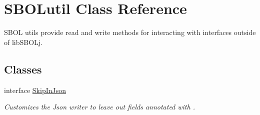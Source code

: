 \hypertarget{classorg_1_1sbolstandard_1_1lib_s_b_o_lj_1_1_s_b_o_lutil}{
\section{SBOLutil Class Reference}
\label{classorg_1_1sbolstandard_1_1lib_s_b_o_lj_1_1_s_b_o_lutil}
}


SBOL utils provide read and write methods for interacting with interfaces outside of libSBOLj.  


\subsection*{Classes}
\begin{DoxyCompactItemize}
\item 
interface \hyperlink{interfaceorg_1_1sbolstandard_1_1lib_s_b_o_lj_1_1_s_b_o_lutil_1_1_skip_in_json}{SkipInJson}
\begin{DoxyCompactList}\small\item\em Customizes the Json writer to leave out fields annotated with . \item\end{DoxyCompactList}\end{DoxyCompactItemize}

